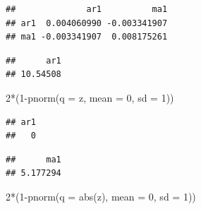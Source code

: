 \documentclass[
]{book}
\newenvironment{Shaded}{\begin{snugshade}}{\end{snugshade}}
\newcommand{\AttributeTok}[1]{\textcolor[rgb]{0.77,0.63,0.00}{#1}}
\newcommand{\CommentTok}[1]{\textcolor[rgb]{0.56,0.35,0.01}{\textit{#1}}}
\newcommand{\DecValTok}[1]{\textcolor[rgb]{0.00,0.00,0.81}{#1}}
\newcommand{\FunctionTok}[1]{\textcolor[rgb]{0.00,0.00,0.00}{#1}}
\newcommand{\NormalTok}[1]{#1}
\newcommand{\OtherTok}[1]{\textcolor[rgb]{0.56,0.35,0.01}{#1}}
\newcommand{\SpecialCharTok}[1]{\textcolor[rgb]{0.00,0.00,0.00}{#1}}
\theoremstyle{definition}
\theoremstyle{definition}
\theoremstyle{definition}
\theoremstyle{definition}
\theoremstyle{remark}
\begin{document}
\begin{verbatim}
##              ar1          ma1
## ar1  0.004060990 -0.003341907
## ma1 -0.003341907  0.008175261
\end{verbatim}

\begin{Shaded}
\end{Shaded}

\begin{verbatim}
##      ar1 
## 10.54508
\end{verbatim}

\begin{Shaded}
\begin{Highlighting}[]
  \DecValTok{2}\SpecialCharTok{*}\NormalTok{(}\DecValTok{1}\SpecialCharTok{{-}}\FunctionTok{pnorm}\NormalTok{(}\AttributeTok{q =}\NormalTok{ z, }\AttributeTok{mean =} \DecValTok{0}\NormalTok{, }\AttributeTok{sd =} \DecValTok{1}\NormalTok{))}
\end{Highlighting}
\end{Shaded}

\begin{verbatim}
## ar1 
##   0
\end{verbatim}

\begin{Shaded}
\end{Shaded}

\begin{verbatim}
##      ma1 
## 5.177294
\end{verbatim}

\begin{Shaded}
\begin{Highlighting}[]
  \DecValTok{2}\SpecialCharTok{*}\NormalTok{(}\DecValTok{1}\SpecialCharTok{{-}}\FunctionTok{pnorm}\NormalTok{(}\AttributeTok{q =} \FunctionTok{abs}\NormalTok{(z), }\AttributeTok{mean =} \DecValTok{0}\NormalTok{, }\AttributeTok{sd =} \DecValTok{1}\NormalTok{))}
\end{Highlighting}
\end{Shaded}
\end{document}
